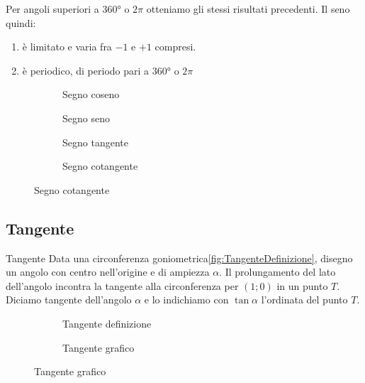 Per angoli superiori a \ang{360} o $2\pi$ otteniamo gli stessi risultati precedenti. 
Il seno quindi:
\begin{enumerate}
	\item è limitato e varia fra $-1$ e $+1$ compresi.
	\item è periodico, di periodo pari a \ang{360} o $2\pi$
\end{enumerate} 
\begin{figure}
	\centering
	
	\label{fig:AndamentoSeno2}
\end{figure}%
\begin{figure}
	\begin{subfigure}[b]{.5\linewidth}
		\centering
		\caption{Segno coseno}\label{fig:SegnoCoseno}
	\end{subfigure}%
	\begin{subfigure}[b]{.5\linewidth}
		\centering
		\caption{Segno seno}\label{fig:SegnoSeno}
	\end{subfigure}
	\begin{subfigure}[b]{.5\linewidth}
		\centering
		\caption{Segno tangente}\label{fig:SegnoTangente}
	\end{subfigure}%
	\begin{subfigure}[b]{.5\linewidth}
		\centering
		\caption{Segno cotangente}\label{fig:SegnoCotangente}
	\end{subfigure}
	\label{tab:segnofunzionigoniometriche}
\end{figure}
\subsection{Tangente}
\begin{definizionet}{Tangente}{}
	Data una circonferenza goniometrica\nobs\vref{fig:TangenteDefinizione}, disegno un angolo con centro nell'origine e di ampiezza $\alpha$. Il prolungamento del lato dell'angolo incontra la tangente alla circonferenza per $(1;0)$ in un punto $T$. Diciamo tangente dell'angolo $\alpha$ e lo indichiamo con $\tan\alpha$ l'ordinata del punto $T$.
\end{definizionet}
\label{sec:Tangente}
\begin{figure}
	\begin{subfigure}[b]{.5\linewidth}
		\centering
			
		\caption{Tangente definizione}\label{fig:TangenteDefinizione}
	\end{subfigure}%
	\begin{subfigure}[b]{.5\linewidth}
		\centering
		\caption{Tangente grafico}\label{fig:TangenteGrafico}
	\end{subfigure}
	\label{tab:funztg}
\end{figure}
